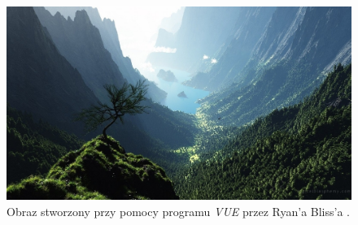 \documentclass[inz,shortabstract]{iithesis}
\begin{document}
        \begin{figure}[H] 
            \includegraphics[width=\linewidth]{vue.png}
            \caption{Obraz stworzony przy pomocy programu \textit{VUE} przez Ryan'a Bliss'a \cite{vue}.} 
            \label{fig:vue}
        \end{figure}
        

        




\end{document}
